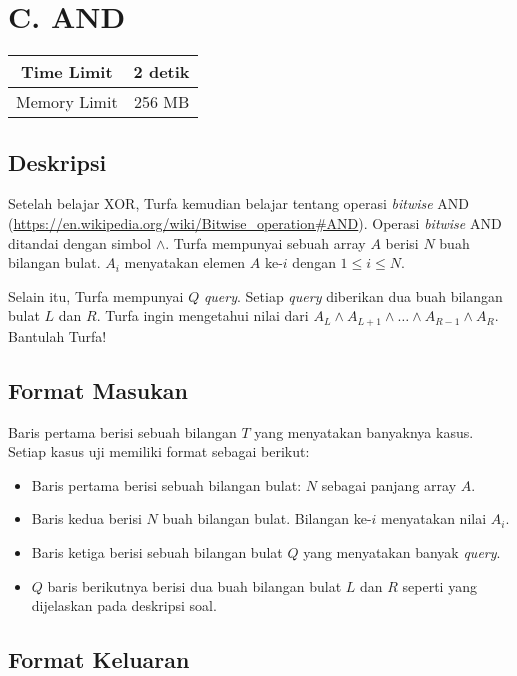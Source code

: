 \documentclass{article}
\begin{document}
\section*{\hfil C. AND\hfil}

\begin{center}
\begin{tabular}{ |cc| } 
 \hline
 Time Limit & 2 detik \\ 
 \hline
 Memory Limit & 256 MB \\
 \hline
\end{tabular}
\end{center}

\subsection*{Deskripsi}
\par Setelah belajar XOR, Turfa kemudian belajar tentang operasi \textit{bitwise} AND (\url{https://en.wikipedia.org/wiki/Bitwise_operation#AND}). Operasi \textit{bitwise} AND ditandai dengan simbol $\land$. Turfa mempunyai sebuah array $A$ berisi $N$ buah bilangan bulat. $A_{i}$ menyatakan elemen $A$ ke-$i$ dengan $1 \leq i \leq N$.
\par\noindent Selain itu, Turfa mempunyai $Q$ \textit{query}. Setiap \textit{query} diberikan dua buah bilangan bulat $L$ dan $R$. Turfa ingin mengetahui nilai dari $A_{L} \land A_{L+1} \land \dots \land A_{R-1} \land A_{R}$. Bantulah Turfa!

\subsection*{Format Masukan}
\par Baris pertama berisi sebuah bilangan $T$ yang menyatakan banyaknya kasus. Setiap kasus uji memiliki format sebagai berikut:
\begin{itemize}
\item Baris pertama berisi sebuah bilangan bulat: $N$ sebagai panjang array $A$.
\item Baris kedua berisi $N$ buah bilangan bulat. Bilangan ke-$i$ menyatakan nilai $A_{i}$.
\item Baris ketiga berisi sebuah bilangan bulat $Q$ yang menyatakan banyak \textit{query}.
\item $Q$ baris berikutnya berisi dua buah bilangan bulat $L$ dan $R$ seperti yang dijelaskan pada deskripsi soal.
\end{itemize}

\subsection*{Format Keluaran}
\end{document}
